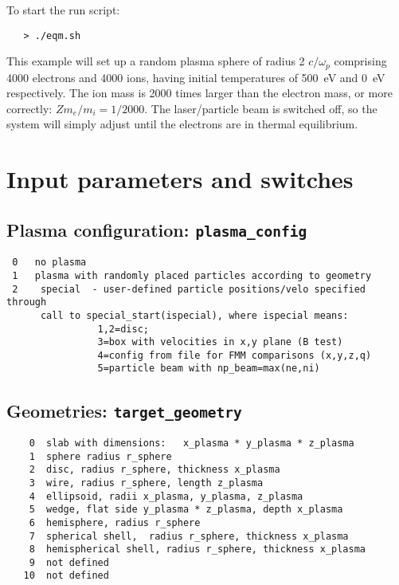 \documentclass[11pt,psfig]{article}
\begin{document}
\normalsize

\noindent
To start the run script:
\begin{verbatim}
   > ./eqm.sh
\end{verbatim}

\noindent
This example will set up a random plasma sphere of radius 2 $c/\omega_p$ comprising 4000 electrons and
4000 ions, having initial temperatures of 500~eV and 0~eV respectively. The
ion mass is 2000 times larger than the electron mass, or more correctly:
$Zm_e/m_i = 1/2000$.  The laser/particle beam is switched off, so the system
will simply adjust until the electrons are in thermal equilibrium.

\section{Input parameters and switches \label{inputs}}

\subsection{Plasma configuration:  {\tt plasma\_config}}
\begin{verbatim}
 0   no plasma
 1   plasma with randomly placed particles according to geometry
 2    special  - user-defined particle positions/velo specified through 
      call to special_start(ispecial), where ispecial means:
                1,2=disc;
                3=box with velocities in x,y plane (B test)
                4=config from file for FMM comparisons (x,y,z,q)
                5=particle beam with np_beam=max(ne,ni)
\end{verbatim}

\subsection{Geometries:  {\tt target\_geometry}}
\begin{verbatim}
    0  slab with dimensions:   x_plasma * y_plasma * z_plasma
    1  sphere radius r_sphere
    2  disc, radius r_sphere, thickness x_plasma
    3  wire, radius r_sphere, length z_plasma
    4  ellipsoid, radii x_plasma, y_plasma, z_plasma
    5  wedge, flat side y_plasma * z_plasma, depth x_plasma
    6  hemisphere, radius r_sphere
    7  spherical shell,  radius r_sphere, thickness x_plasma
    8  hemispherical shell, radius r_sphere, thickness x_plasma
    9  not defined
   10  not defined 
\end{verbatim}
\end{document}

